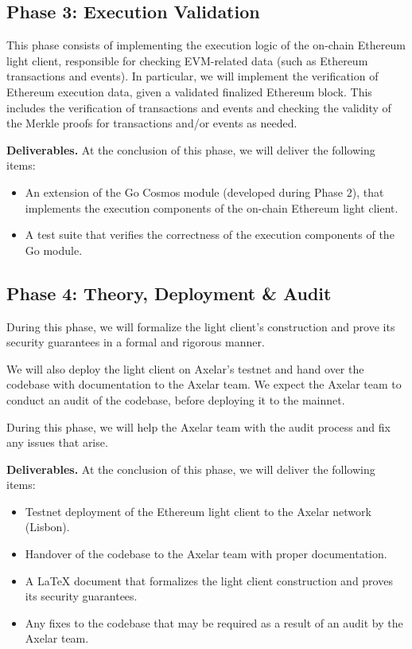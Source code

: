 \subsection{Phase 3: Execution Validation}

This phase consists of implementing the execution logic of the on-chain Ethereum light client, responsible for checking EVM-related data (such as Ethereum transactions and events). In particular, we will implement the verification of Ethereum execution data, given a validated finalized Ethereum block. This includes the verification of transactions and events and checking the validity of the Merkle proofs for transactions and/or events as needed.

\noindent
\textbf{Deliverables.} At the conclusion of this phase, we will deliver the following items:

\begin{itemize}
    \item An extension of the Go Cosmos module (developed during Phase $2$), that implements the execution components of the on-chain Ethereum light client.
    \item A test suite that verifies the correctness of the execution components of the Go module.
\end{itemize}

\subsection{Phase 4: Theory, Deployment \& Audit}

During this phase, we will formalize the light client's construction and prove its security guarantees in a formal and rigorous manner.

We will also deploy the light client on Axelar's testnet and hand over the codebase with documentation to the Axelar team. We expect the Axelar team to conduct an audit of the codebase, before deploying it to the mainnet.

During this phase, we will help the Axelar team with the audit process and fix any issues that arise.

\noindent
\textbf{Deliverables.} At the conclusion of this phase, we will deliver the following items:
\begin{itemize}
  \item Testnet deployment of the Ethereum light client to the Axelar network (Lisbon).
  \item Handover of the codebase to the Axelar team with proper documentation.
  \item A LaTeX document that formalizes the light client construction and proves its security guarantees.
  \item Any fixes to the codebase that may be required as a result of an audit by the Axelar team.
\end{itemize}

